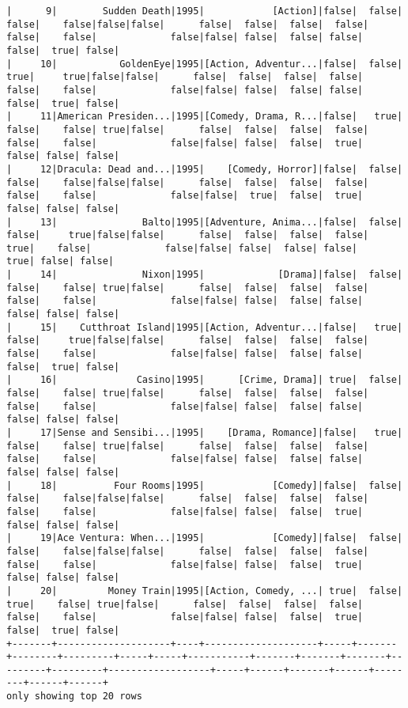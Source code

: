 \documentclass{article}
\begin{document}
\begin{verbatim}
|      9|        Sudden Death|1995|            [Action]|false|  false|   false|    false|false|false|      false|  false|  false|  false|    false|    false|             false|false| false|  false| false|   false|  true| false|
|     10|           GoldenEye|1995|[Action, Adventur...|false|  false|    true|     true|false|false|      false|  false|  false|  false|    false|    false|             false|false| false|  false| false|   false|  true| false|
|     11|American Presiden...|1995|[Comedy, Drama, R...|false|   true|   false|    false| true|false|      false|  false|  false|  false|    false|    false|             false|false| false|  false|  true|   false| false| false|
|     12|Dracula: Dead and...|1995|    [Comedy, Horror]|false|  false|   false|    false|false|false|      false|  false|  false|  false|    false|    false|             false|false|  true|  false|  true|   false| false| false|
|     13|               Balto|1995|[Adventure, Anima...|false|  false|   false|     true|false|false|      false|  false|  false|  false|     true|    false|             false|false| false|  false| false|    true| false| false|
|     14|               Nixon|1995|             [Drama]|false|  false|   false|    false| true|false|      false|  false|  false|  false|    false|    false|             false|false| false|  false| false|   false| false| false|
|     15|    Cutthroat Island|1995|[Action, Adventur...|false|   true|   false|     true|false|false|      false|  false|  false|  false|    false|    false|             false|false| false|  false| false|   false|  true| false|
|     16|              Casino|1995|      [Crime, Drama]| true|  false|   false|    false| true|false|      false|  false|  false|  false|    false|    false|             false|false| false|  false| false|   false| false| false|
|     17|Sense and Sensibi...|1995|    [Drama, Romance]|false|   true|   false|    false| true|false|      false|  false|  false|  false|    false|    false|             false|false| false|  false| false|   false| false| false|
|     18|          Four Rooms|1995|            [Comedy]|false|  false|   false|    false|false|false|      false|  false|  false|  false|    false|    false|             false|false| false|  false|  true|   false| false| false|
|     19|Ace Ventura: When...|1995|            [Comedy]|false|  false|   false|    false|false|false|      false|  false|  false|  false|    false|    false|             false|false| false|  false|  true|   false| false| false|
|     20|         Money Train|1995|[Action, Comedy, ...| true|  false|    true|    false| true|false|      false|  false|  false|  false|    false|    false|             false|false| false|  false|  true|   false|  true| false|
+-------+--------------------+----+--------------------+-----+-------+--------+---------+-----+-----+-----------+-------+-------+-------+---------+---------+------------------+-----+------+-------+------+--------+------+------+
only showing top 20 rows
\end{verbatim}
\end{document}

